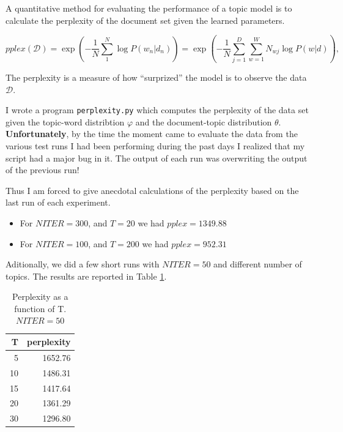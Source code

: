 \documentclass[11pt]{article}
\newcommand{\program}[1]{\texttt{#1}}
\newcommand{\DD}{\mathcal{D}}
\begin{document}
        A quantitative method for evaluating the performance of a topic model 
        is to calculate the perplexity of the document set given the learned parameters.

        \begin{equation}
            pplex\!\left(\DD\right) = \exp\left( - \frac{1}{N} \sum_1^N \log P(w_n|d_n) \right) =
            \exp\left( - \frac{1}{N} \sum_{j=1}^D\sum_{w=1}^W N_{wj}\log P(w|d) \right) ,
        \end{equation}

        The perplexity is a measure of how ``surprized'' the model is to observe the data $\DD$.


        I wrote a program \program{perplexity.py} which computes the perplexity of the data set
        given the topic-word distribtion $\varphi$ and the document-topic distribution $\theta$.
        {\bf Unfortunately}, by the time the moment came to evaluate the data from the various test
        runs I had been performing during the past days I realized that my script had a major bug in it.
        The output of each run was overwriting the output of the previous run!

        Thus I am forced to give anecdotal calculations of the perplexity based on the last run
        of each experiment. 
        \begin{itemize}
            \item For $NITER=300$, and $T=20$ we had $pplex=1349.88$
            \item For $NITER=100$, and $T=200$ we had $pplex=952.31$
        \end{itemize}

        Aditionally, we did a few short runs with $NITER=50$ and different number of topics.
        The results are reported in Table \ref{table:perplexities}.

        \begin{table}[h]
        \centering
        \caption{Perplexity as a function of T. $NITER=50$}
        \begin{tabular}{|r r |}
        \hline
        T   &   perplexity \\
        \hline 
        5   &   1652.76 \\
        10  &   1486.31 \\
        15  &   1417.64 \\
        20  &   1361.29 \\
        30  &   1296.80  \\
        \hline
        \end{tabular}
        \label{table:perplexities}
        \end{table}
\end{document}
